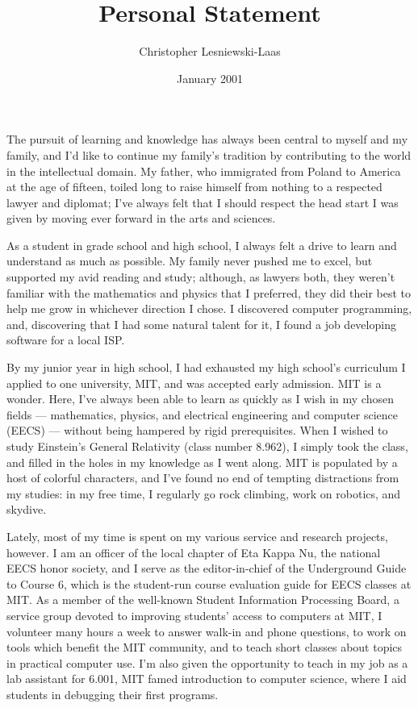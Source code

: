 \documentclass[11pt]{article}
\title{Personal Statement}
\author{Christopher Lesniewski-Laas}
\date{January 2001}
\begin{document}
\maketitle



The pursuit of learning and knowledge has always been central to
myself and my family, and I'd like to continue my family's tradition
by contributing to the world in the intellectual domain.  My father,
who immigrated from Poland to America at the age of fifteen, toiled
long to raise himself from nothing to a respected lawyer and diplomat;
I've always felt that I should respect the head start I was given by
moving ever forward in the arts and sciences.

As a student in grade school and high school, I always felt a drive to
learn and understand as much as possible.  My family never pushed me
to excel, but supported my avid reading and study; although, as
lawyers both, they weren't familiar with the mathematics and physics
that I preferred, they did their best to help me grow in whichever
direction I chose.  I discovered computer programming, and,
discovering that I had some natural talent for it, I found a job
developing software for a local ISP.

By my junior year in high school, I had exhausted my high school's
curriculum I applied to one university, MIT, and was accepted early
admission.  MIT is a wonder.  Here, I've always been able to learn as
quickly as I wish in my chosen fields --- mathematics, physics, and
electrical engineering and computer science (EECS) --- without being
hampered by rigid prerequisites.  When I wished to study Einstein's
General Relativity (class number 8.962), I simply took the class, and
filled in the holes in my knowledge as I went along.  MIT is populated
by a host of colorful characters, and I've found no end of tempting
distractions from my studies: in my free time, I regularly go rock
climbing, work on robotics, and skydive.

Lately, most of my time is spent on my various service and research
projects, however.  I am an officer of the local chapter of Eta Kappa
Nu, the national EECS honor society, and I serve as the
editor-in-chief of the Underground Guide to Course 6, which is the
student-run course evaluation guide for EECS classes at MIT.  As a
member of the well-known Student Information Processing Board, a
service group devoted to improving students' access to computers at
MIT, I volunteer many hours a week to answer walk-in and phone
questions, to work on tools which benefit the MIT community, and to
teach short classes about topics in practical computer use.  I'm also
given the opportunity to teach in my job as a lab assistant for 6.001,
MIT famed introduction to computer science, where I aid students in
debugging their first programs.
\end{document}
